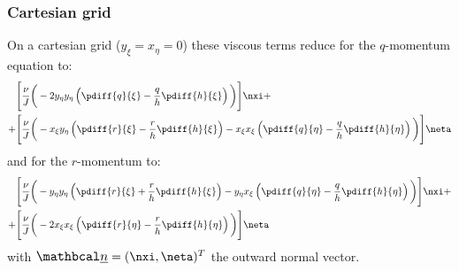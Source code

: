 \subsubsection*{Cartesian grid}
On a cartesian grid ($y_\xi = x_\eta = 0$) these viscous terms reduce for the $q$-momentum equation to:
\begin{align}
    \Bigg[& \frac{\nu}{J} \bigg(
    - 2 y_{\eta}  y_{\eta} \left(\pdiff{q}{\xi} - \frac{q}{h}\pdiff{h}{\xi} \right)
    \bigg) \Bigg] \nxi +
    \\
    +\Bigg[& \frac{\nu}{J} \bigg(
    - x_{\xi}y_{\eta} \left(\pdiff{r}{\xi} - \frac{r}{h}\pdiff{h}{\xi} \right)
    - x_{\xi}x_{\xi} \left(\pdiff{q}{\eta} - \frac{q}{h}\pdiff{h}{\eta} \right) \bigg) \Bigg] \neta
    \label{eq:cart_xi_viscous_term}
\end{align}
and for the $r$-momentum to:
\begin{align}
    \Bigg[&\frac{\nu}{J} \bigg(
    - y_{\eta} y_{\eta}  \left(\pdiff{r}{\xi} + \frac{r}{h}\pdiff{h}{\xi} \right)
    - y_{\eta} x_{\xi} \left(\pdiff{q}{\eta} - \frac{q}{h}\pdiff{h}{\eta} \right)     \bigg) \Bigg] \nxi
    +
    \\
    + \Bigg[ & \frac{\nu}{J} \bigg(
    - 2 x_{\xi}x_{\xi} \left(\pdiff{r}{\eta} - \frac{r}{h}\pdiff{h}{\eta} \right) \bigg) \Bigg] \neta
    \label{eq:cart_eta_viscous_term}
\end{align}
with $\vecn = (\nxi, \neta)^T$ the outward normal vector.
